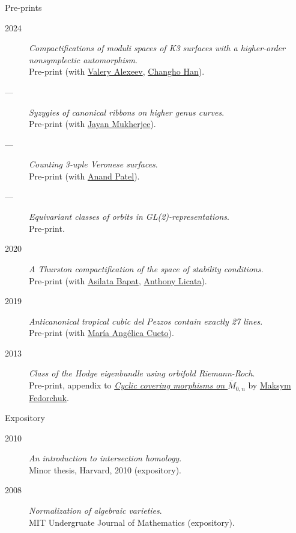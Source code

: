 \documentclass[11pt]{article}
\begin{document}
\begin{description}
\item[{Pre-prints}] 
\end{description}
\label{orgbb16e5c}
\begin{description}
\item[{2024}] \emph{Compactifications of moduli spaces of K3 surfaces with a higher-order nonsymplectic automorphism}.\\
Pre-print (with \href{https://www.math.uga.edu/directory/people/valery-alexeev}{Valery Alexeev}, \href{https://sites.google.com/view/changho-han/}{Changho Han}).
\item[{---}] \emph{Syzygies of canonical ribbons on higher genus curves}.\\
Pre-print (with \href{https://sites.google.com/view/mukherjeejayan}{Jayan Mukherjee}).
\item[{---}] \emph{Counting 3-uple Veronese surfaces}.\\
Pre-print (with \href{https://sites.google.com/view/anand-patel}{Anand Patel}).
\item[{---}] \emph{Equivariant classes of orbits in GL(2)-representations}.\\
Pre-print.
\item[{2020}] \emph{A Thurston compactification of the space of stability conditions}.\\
Pre-print (with \href{https://asilata.org/}{Asilata Bapat}, \href{https://maths-people.anu.edu.au/\~licatat/}{Anthony Licata}).
\item[{2019}] \emph{Anticanonical tropical cubic del Pezzos contain exactly 27 lines}.\\
Pre-print (with \href{https://people.math.osu.edu/cueto.5/}{María Angélica Cueto}).
\item[{2013}] \emph{Class of the Hodge eigenbundle using orbifold Riemann-Roch}.\\
Pre-print, appendix to \href{https://drive.google.com/file/d/1wq-Fh3DiqODc51t-J0phIexVF7B4lxsY/view}{\emph{Cyclic covering morphisms on \(\overline M_{0,n}\)}} by \href{https://www2.bc.edu/maksym-fedorchuk/}{Maksym Fedorchuk}.
\end{description}

\begin{description}
\item[{Expository}] 
\end{description}
\label{orgf26bac7}
\begin{description}
\item[{2010}] \emph{An introduction to intersection homology}.\\
Minor thesis, Harvard, 2010 (expository).
\item[{2008}] \emph{Normalization of algebraic varieties}.\\
MIT Undergruate Journal of Mathematics (expository).
\end{description}
\end{document}

